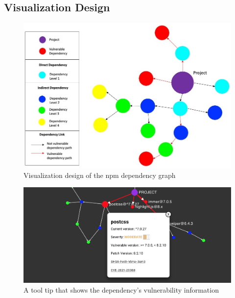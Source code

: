 \documentclass[conference]{IEEEtran}
\begin{document}
	
	\subsection{Visualization Design}
	
	\begin{figure}[tb]
		\centering
		\includegraphics[width=\columnwidth]{Figures/Viz-concept-1.jpg}
		\caption{Visualization design of the npm dependency graph}
		\label{fig:viz-concept}
	\end{figure}

	\begin{figure}
		\centering
		\includegraphics[width=\columnwidth]{Figures/tooltip_moderate}
		\caption{A tool tip that shows the dependency's vulnerability information}
		\label{fig:tooltip_moderate}
	\end{figure}
	
\end{document}
